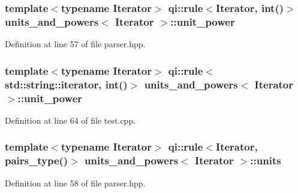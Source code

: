 \subsubsection[{\texorpdfstring{unit\+\_\+power}{unit_power}}]{\setlength{\rightskip}{0pt plus 5cm}template$<$typename Iterator$>$ qi\+::rule$<$Iterator, int()$>$ {\bf units\+\_\+and\+\_\+powers}$<$ Iterator $>$\+::unit\+\_\+power}\hypertarget{structunits__and__powers_a90d733fe21d7d5efc2a599b0ab6df131}{}\label{structunits__and__powers_a90d733fe21d7d5efc2a599b0ab6df131}


Definition at line 57 of file parser.\+hpp.

\subsubsection[{\texorpdfstring{unit\+\_\+power}{unit_power}}]{\setlength{\rightskip}{0pt plus 5cm}template$<$typename Iterator$>$ qi\+::rule$<$std\+::string\+::iterator, int()$>$ {\bf units\+\_\+and\+\_\+powers}$<$ Iterator $>$\+::unit\+\_\+power}\hypertarget{structunits__and__powers_a986afcb2d8eb3142b4ec0a662a1b5cc5}{}\label{structunits__and__powers_a986afcb2d8eb3142b4ec0a662a1b5cc5}


Definition at line 64 of file test.\+cpp.

\subsubsection[{\texorpdfstring{units}{units}}]{\setlength{\rightskip}{0pt plus 5cm}template$<$typename Iterator$>$ qi\+::rule$<$Iterator, {\bf pairs\+\_\+type}()$>$ {\bf units\+\_\+and\+\_\+powers}$<$ Iterator $>$\+::units}\hypertarget{structunits__and__powers_ab2d482b29c10f220fbbb3bbaf79d63ef}{}\label{structunits__and__powers_ab2d482b29c10f220fbbb3bbaf79d63ef}


Definition at line 58 of file parser.\+hpp.

